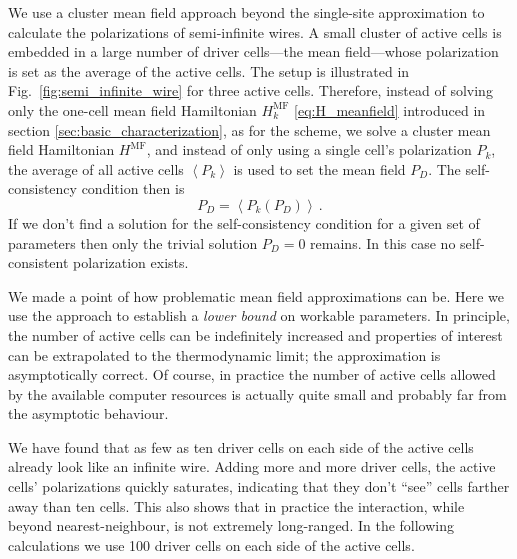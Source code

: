 We use a cluster mean field approach beyond the single-site  approximation
to calculate the polarizations of semi-infinite wires. A small cluster of active
cells is embedded in a large number of driver cells---the mean field---whose
polarization is set as the average of the active cells. The setup is illustrated
in Fig.~\ref{fig:semi_infinite_wire} for three active cells. Therefore, instead
of solving only the one-cell mean field Hamiltonian $H^{\mathrm{MF}}_k$
\eqref{eq:H_meanfield} introduced in section \ref{sec:basic_characterization},
as for the  scheme, we solve a cluster mean field Hamiltonian
$H^{\mathrm{MF}}$, and instead of only using a single cell's polarization $P_k$,
the average of all active cells $\left< P_k \right>$ is used to set the mean
field $P_D$. The self-consistency condition then is
%
\begin{equation}
  P_D = \left< P_k \left( P_D \right) \right> \, .
\end{equation}
%
If we don't find a solution for the self-consistency condition for a given set
of parameters then only the trivial solution $P_D = 0$ remains. In this case no
self-consistent polarization exists.

We made a point of how problematic mean field approximations can be. Here we use
the approach to establish a \emph{lower bound} on workable parameters. In
principle, the number of active cells can be indefinitely increased and
properties of interest can be extrapolated to the thermodynamic limit; the
approximation is asymptotically correct. Of course, in practice the number of
active cells allowed by the available computer resources is actually quite small
and probably far from the asymptotic behaviour.

We have found that as few as ten driver cells on each side of the active cells
already look like an infinite wire. Adding more and more driver cells, the active
cells' polarizations quickly saturates, indicating that they don't ``see'' cells
farther away than ten cells. This also shows that in practice the interaction,
while beyond nearest-neighbour, is not extremely long-ranged. In the following
calculations we use 100 driver cells on each side of the active cells.

